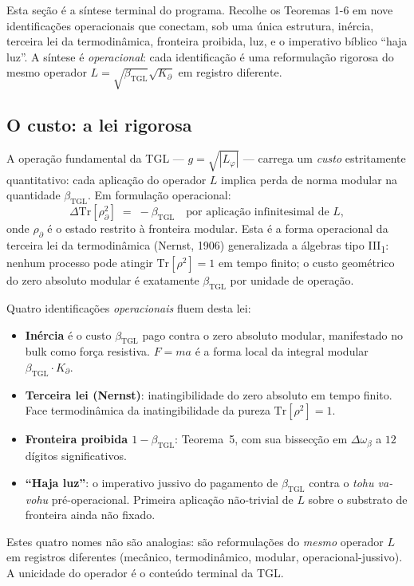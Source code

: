 \documentclass[12pt,a4paper]{article}
\newcommand{\betatgl}{\beta_{\text{TGL}}}
\newcommand{\Kpartial}{K_{\partial}}
\newcommand{\Lphi}{L_{\varphi}}
\newcommand{\TGL}{\textsc{TGL}}
\begin{document}
Esta seção é a síntese terminal do programa.  Recolhe os Teoremas 1-6 em
nove identificações operacionais que conectam, sob uma única estrutura,
inércia, terceira lei da termodinâmica, fronteira proibida, luz, e o
imperativo bíblico ``haja luz''.  A síntese é \emph{operacional}: cada
identificação é uma reformulação rigorosa do mesmo operador
$L = \sqrt{\betatgl}\sqrt{\Kpartial}$ em registro diferente.

\subsection{O custo: a lei rigorosa}
\label{subsec:custo}

A operação fundamental da \TGL{} --- $g = \sqrt{|\Lphi|}$ --- carrega um
\emph{custo} estritamente quantitativo: cada aplicação do operador $L$
implica perda de norma modular na quantidade $\betatgl$.  Em formulação
operacional:
\begin{equation}
\Delta \mathrm{Tr}[\rho_{\partial}^{2}]
\;=\; -\betatgl \quad \text{por aplicação infinitesimal de } L,
\label{eq:custo-rigoroso}
\end{equation}
onde $\rho_{\partial}$ é o estado restrito à fronteira modular.  Esta é
a forma operacional da terceira lei da termodinâmica (Nernst, 1906)
generalizada a álgebras tipo III\textsubscript{1}: nenhum processo
pode atingir $\mathrm{Tr}[\rho^{2}] = 1$ em tempo finito; o custo
geométrico do zero absoluto modular é exatamente $\betatgl$ por unidade
de operação.

Quatro identificações \emph{operacionais} fluem desta lei:
\begin{itemize}[leftmargin=*]
\item \textbf{Inércia} é o custo $\betatgl$ pago contra o zero absoluto
modular, manifestado no bulk como força resistiva.  $F = ma$ é a forma
local da integral modular $\betatgl \cdot \Kpartial$.
\item \textbf{Terceira lei (Nernst)}: inatingibilidade do zero absoluto
em tempo finito.  Face termodinâmica da inatingibilidade da pureza
$\mathrm{Tr}[\rho^{2}] = 1$.
\item \textbf{Fronteira proibida $1 - \betatgl$}: Teorema~5, com sua
bissecção em $\Delta\omega_{\beta}$ a $12$ dígitos significativos.
\item \textbf{``Haja luz''}: o imperativo jussivo do pagamento de
$\betatgl$ contra o \emph{tohu va-vohu} pré-operacional.  Primeira
aplicação não-trivial de $L$ sobre o substrato de fronteira ainda não
fixado.
\end{itemize}
Estes quatro nomes não são analogias: são reformulações do \emph{mesmo}
operador $L$ em registros diferentes (mecânico, termodinâmico, modular,
operacional-jussivo).  A unicidade do operador é o conteúdo terminal
da \TGL{}.
\end{document}
